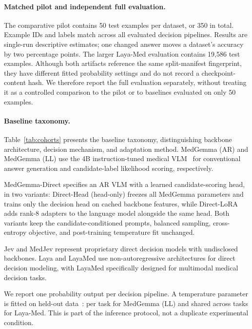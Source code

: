 \paragraph{Matched pilot and independent full evaluation.}
The comparative pilot contains 50 test examples per dataset, or 350 in total. Example IDs and labels match across all evaluated decision pipelines. Results are single-run descriptive estimates; one changed answer moves a dataset's accuracy by two percentage points. The larger Laya-Med evaluation contains 19,586 test examples. Although both artifacts reference the same split-manifest fingerprint, they have different fitted probability settings and do not record a checkpoint-content hash. We therefore report the full evaluation separately, without treating it as a controlled comparison to the pilot or to baselines evaluated on only 50 examples.




\paragraph{Baseline taxonomy.}
Table~\ref{tab:cohorts} presents the baseline taxonomy, distinguishing backbone architecture, decision mechanism, and adaptation method. MedGemma (AR) and MedGemma (LL) use the 4B instruction-tuned medical VLM~\cite{medgemma2025} for conventional answer generation and candidate-label likelihood scoring, respectively.

MedGemma-Direct specifies an AR VLM with a learned candidate-scoring head, in two variants: Direct-Head (head-only) freezes all MedGemma parameters and trains only the decision head on cached backbone features, while Direct-LoRA adds rank-8 adapters to the language model alongside the same head. Both variants keep the candidate-conditioned prompts, balanced sampling, cross-entropy objective, and post-training temperature fit unchanged.

Jev and MedJev represent proprietary direct decision models with undisclosed backbones. Laya and LayaMed use non-autoregressive architectures for direct decision modeling, with LayaMed specifically designed for multimodal medical decision tasks.

We report one probability output per decision pipeline. A temperature parameter is fitted on held-out data~\cite{guo2017calibration}: per task for MedGemma (LL) and shared across tasks for Laya-Med. This is part of the inference protocol, not a duplicate experimental condition.

